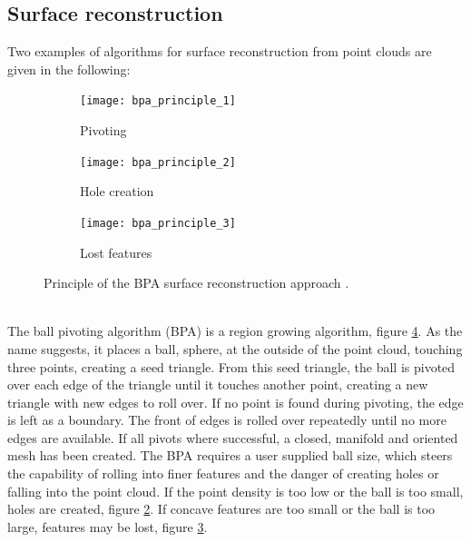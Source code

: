 \subsection{Surface reconstruction}
\label{sec:point_cloud_reconstruction}

Two examples of algorithms for surface reconstruction from point clouds are given in the following:

\begin{description}
	\begin{figure}
		\centering
		\begin{subfigure}[b]{0.30\textwidth}
			\centering
			\texttt{[image: bpa\_principle\_1]}
			\caption{
				Pivoting
			}
			\label{fig:bpa_principle_1}
		\end{subfigure}
		\begin{subfigure}[b]{0.30\textwidth}
			\centering
			\texttt{[image: bpa\_principle\_2]}
			\caption{
				Hole creation
			}
			\label{fig:bpa_principle_2}
		\end{subfigure}
		\begin{subfigure}[b]{0.30\textwidth}
			\centering
			\texttt{[image: bpa\_principle\_3]}
			\caption{
				Lost features
			}
			\label{fig:bpa_principle_3}
		\end{subfigure}
		\caption{
			Principle of the BPA surface reconstruction approach \cite{bpa}.
		}
		\label{fig:bpa_principle}
	\end{figure}

	\item[Ball pivoting algorithm] \hfill \\
	The ball pivoting algorithm (BPA) is a region growing algorithm, \cf figure \ref{fig:bpa_principle}.
	As the name suggests, it places a ball, \ie sphere, at the outside of the point cloud, touching three points, creating a seed triangle.
	From this seed triangle, the ball is pivoted over each edge of the triangle until it touches another point, creating a new triangle with new edges to roll over.
	If no point is found during pivoting, the edge is left as a boundary.
	The front of edges is rolled over repeatedly until no more edges are available.
	If all pivots where successful, a closed, manifold and oriented mesh has been created.
	The BPA requires a user supplied ball size, which steers the capability of rolling into finer features and the danger of creating holes or falling into the point cloud.
	If the point density is too low or the ball is too small, holes are created, \cf figure \ref{fig:bpa_principle_2}.
	If concave features are too small or the ball is too large, features may be lost, \cf figure \ref{fig:bpa_principle_3}.


\end{description}
